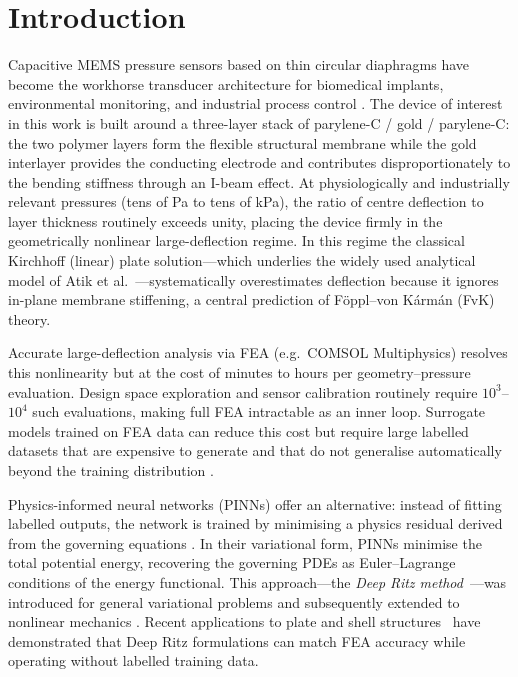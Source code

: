\documentclass[review,12pt]{elsarticle}
\begin{document}
\section{Introduction}
\label{sec:intro}

Capacitive MEMS pressure sensors based on thin circular diaphragms have become
the workhorse transducer architecture for biomedical implants, environmental
monitoring, and industrial process control
\cite{fragiacomo2010,lo2007,sim2005}. The device of interest in this work is
built around a three-layer stack of parylene-C / gold / parylene-C: the two
polymer layers form the flexible structural membrane while the gold interlayer
provides the conducting electrode and contributes disproportionately to the
bending stiffness through an I-beam effect. At physiologically and
industrially relevant pressures (tens of Pa to tens of kPa), the ratio of
centre deflection to layer thickness routinely exceeds unity, placing the
device firmly in the geometrically nonlinear large-deflection regime. In this
regime the classical Kirchhoff (linear) plate solution—which underlies the
widely used analytical model of Atik et al.~\cite{atik2020}—systematically
overestimates deflection because it ignores in-plane membrane stiffening, a
central prediction of Föppl–von Kármán (FvK) theory.

Accurate large-deflection analysis via FEA (e.g.\ COMSOL Multiphysics) resolves
this nonlinearity but at the cost of minutes to hours per geometry–pressure
evaluation. Design space exploration and sensor calibration routinely require
$10^3$–$10^4$ such evaluations, making full FEA intractable as an inner loop.
Surrogate models trained on FEA data can reduce this cost but require large
labelled datasets that are expensive to generate and that do not generalise
automatically beyond the training distribution
\cite{zacchei2024,dibarba2022}.

Physics-informed neural networks (PINNs) offer an alternative: instead of
fitting labelled outputs, the network is trained by minimising a physics
residual derived from the governing equations
\cite{raissi2019,lagaris1998,karniadakis2021}.  In their variational form,
PINNs minimise the total potential energy, recovering the governing PDEs as
Euler–Lagrange conditions of the energy functional. This approach—the
\emph{Deep Ritz method}~\cite{e2018}—was introduced for general variational
problems and subsequently extended to nonlinear mechanics
\cite{samaniego2020,fuhg2022}.  Recent applications to plate and shell
structures~\cite{wangThai2025} have demonstrated that Deep Ritz formulations
can match FEA accuracy while operating without labelled training data.
\end{document}
